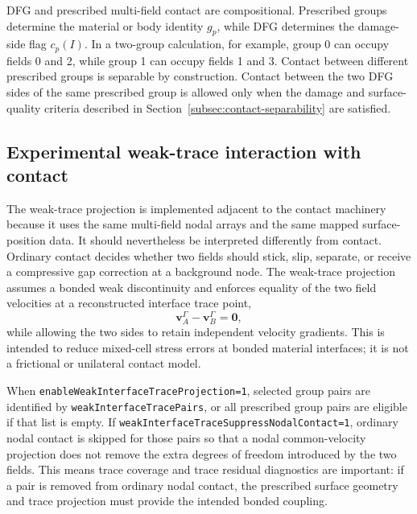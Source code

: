 DFG and prescribed multi-field contact are compositional.  Prescribed groups determine the material or body identity $g_p$, while DFG determines the damage-side flag $c_p(I)$.  In a two-group calculation, for example, group 0 can occupy fields 0 and 2, while group 1 can occupy fields 1 and 3.  Contact between different prescribed groups is separable by construction.  Contact between the two DFG sides of the same prescribed group is allowed only when the damage and surface-quality criteria described in Section~\ref{subsec:contact-separability} are satisfied.

\subsection{Experimental weak-trace interaction with contact}
\label{subsec:contact-weak-trace-interaction}

The weak-trace projection is implemented adjacent to the contact machinery because it uses the same multi-field nodal arrays and the same mapped surface-position data.  It should nevertheless be interpreted differently from contact.  Ordinary contact decides whether two fields should stick, slip, separate, or receive a compressive gap correction at a background node.  The weak-trace projection assumes a bonded weak discontinuity and enforces equality of the two field velocities at a reconstructed interface trace point,
\begin{equation}
  \mathbf{v}^{\Gamma}_{A}-\mathbf{v}^{\Gamma}_{B}=\mathbf{0},
\end{equation}
while allowing the two sides to retain independent velocity gradients.  This is intended to reduce mixed-cell stress errors at bonded material interfaces; it is not a frictional or unilateral contact model.

When \texttt{enableWeakInterfaceTraceProjection=1}, selected group pairs are identified by \texttt{weakInterfaceTracePairs}, or all prescribed group pairs are eligible if that list is empty.  If \texttt{weakInterfaceTraceSuppressNodalContact=1}, ordinary nodal contact is skipped for those pairs so that a nodal common-velocity projection does not remove the extra degrees of freedom introduced by the two fields.  This means trace coverage and trace residual diagnostics are important: if a pair is removed from ordinary nodal contact, the prescribed surface geometry and trace projection must provide the intended bonded coupling.

